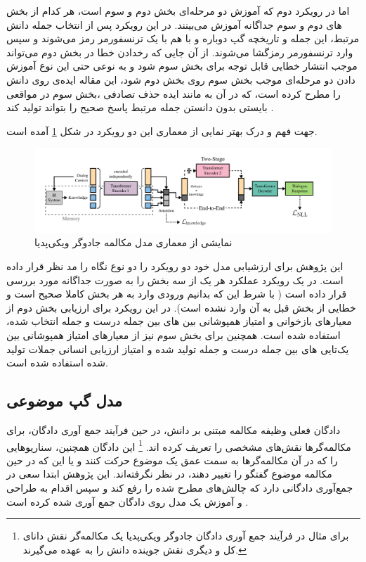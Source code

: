 اما در رویکرد دوم که آموزش دو مرحله‌ای بخش دوم و سوم است، هر کدام از بخش ‌های دوم و سوم جداگانه آموزش می‌بینند. در این رویکرد پس از انتخاب جمله دانش مرتبط، این جمله و تاریخچه گپ دوباره و با هم با یک ترنسفورمر رمز می‌شوند و سپس وارد ترنسفورمر رمزگشا می‌شوند. از آن جایی که رخدادن خطا در بخش دوم می‌تواند موجب انتشار خطایی قابل توجه برای بخش سوم شود و به نوعی حتی این نوع آموزش دادن دو مرحله‌ای موجب
 بخش سوم روی بخش دوم شود، این مقاله ایده‌ی 
 روی دانش را مطرح کرده است، که در آن به مانند ایده حذف تصادفی
،بخش سوم در مواقعی بایستی بدون دانستن جمله مرتبط   پاسخ صحیح را بتواند تولید کند
\cite{wizard}.

  جهت فهم و درک بهتر نمایی از معماری این دو رویکرد در شکل
\ref{fig:chap2:wizard-arch}
آمده است.

 \begin{figure}[H]
	\centering
	\includegraphics[width=1\textwidth]{images/chap2/wizard_arch.png}
	\caption{نمایشی از معماری مدل مکالمه جادوگر ویکی‌پدیا
		\cite{wizard}}	
	\label{fig:chap2:wizard-arch}
\end{figure}

این پژوهش برای ارزشیابی مدل خود دو رویکرد را دو نوع نگاه را مد نظر قرار داده است. در یک رویکرد عملکرد هر یک از سه بخش را به صورت جداگانه مورد بررسی قرار داده است ( با شرط این که بدانیم ورودی وارد به هر بخش کاملا صحیح است و خطایی از بخش قبل به آن وارد نشده است). در این رویکرد برای ارزیابی بخش دوم از معیارهای بازخوانی و امتیاز 
همپوشانی
بین 
‌های بین جمله درست و جمله انتخاب شده، استفاده شده است. همچنین برای بخش سوم نیز از معیار‌های 
امتیاز 
همپوشانی
بین 
یک‌تایی
‌های بین جمله درست و جمله تولید شده
و امتیاز ارزیابی انسانی جملات تولید شده استفاده شده است.


\subsection{مدل گپ موضوعی}

دادگان فعلی وظیفه مکالمه مبتنی بر دانش،‌ در حین فرآیند جمع آوری دادگان،‌ برای مکالمه‌گرها نقش‌های مشخصی را تعریف کرده اند.
\footnote{برای مثال در فرآیند جمع آوری دادگان جادوگر ویکی‌پدیا یک مکالمه‌گر نقش دانای کل و دیگری نقش جوینده دانش را به عهده می‌گیرند.}
 این دادگان همچنین، سناریو‌هایی را که در آن مکالمه‌گرها به سمت عمق یک  موضوع حرکت کنند و یا این که در حین مکالمه موضوع گفتگو را تغییر دهند، در نظر نگرفته‌اند. این پژوهش ابتدا سعی در جمع‌آوری دادگانی دارد که چالش‌های مطرح شده را رفع کند و سپس اقدام به طراحی و آموزش یک مدل روی دادگان جمع آوری شده کرده است
 \cite{Topical_Chat}.

